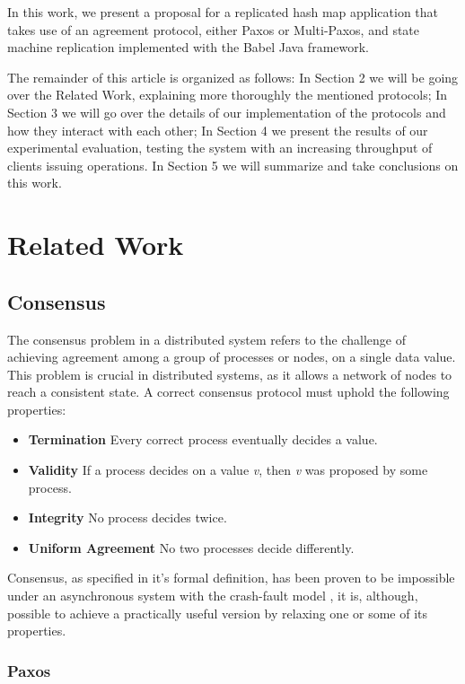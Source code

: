 \documentclass[sigconf]{acmart}
\begin{document}
In this work, we present a proposal for a replicated hash map application that takes use of an agreement protocol, either Paxos or Multi-Paxos, and state machine replication implemented with the Babel \cite{fouto2022babel} Java framework.

The remainder of this article is organized as follows: In Section 2 we will be going over the Related Work, explaining more thoroughly the mentioned protocols; In Section 3 we will go over the details of our implementation of the protocols and how they interact with each other; In Section 4 we present the results of our experimental evaluation, testing the system with an increasing throughput of clients issuing operations. In Section 5 we will summarize and take conclusions on this work.


\section{Related Work}

\subsection{Consensus}

The consensus problem in a distributed system refers to the challenge of achieving agreement among a group of processes or nodes, on a single data value. This problem is crucial in distributed systems, as it allows a network of nodes to reach a consistent state. A correct consensus protocol must uphold the following properties:

\begin{itemize}
    \item \textbf{Termination} Every correct process eventually decides a value.
    \item \textbf{Validity} If a process decides on a value \textit{v}, then \textit{v} was proposed by some process.
    \item \textbf{Integrity} No process decides twice.
    \item \textbf{Uniform Agreement} No two processes decide differently. 
\end{itemize}

Consensus, as specified in it's formal definition, has been proven to be impossible under an asynchronous system with the crash-fault model \cite{fischer1985impossibility}, it is, although, possible to achieve a practically useful version by relaxing one or some of its properties.

\subsubsection{Paxos} 
\end{document}
